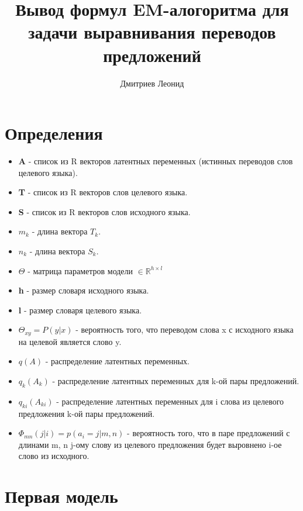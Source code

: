 \documentclass[10pt]{article}
\author{Дмитриев Леонид}
\title{Вывод формул EM-алогоритма для задачи выравнивания переводов предложений}
\begin{document}
	{
		\LARGE
		\maketitle
	}

    { \large \tableofcontents}
    
    \clearpage


   \section*{Определения}
   
   \begin{itemize}  
       \item \textbf{A} - список из R векторов латентных переменных (истинных переводов слов целевого языка).  
       \item \textbf{T} - список из R векторов слов целевого языка.  
       \item \textbf{S} - список из R векторов слов исходного языка.  
       \item $m_k$ - длина вектора $T_k$.  
       \item $n_k$ - длина вектора $S_k$.  
       \item $\Theta$ - матрица параметров модели $\in \mathbb{R}^{h \times l}$  
       \item \textbf{h} - размер словаря исходного языка.  
       \item \textbf{l} - размер словаря целевого языка.  
       \item $\Theta_{xy} = P(y|x)$ - вероятность того, что переводом слова x с исходного языка на целевой является слово y.  
       \item $q(A)$ - распределение латентных переменных.  
       \item $q_k(A_k)$ - распределение латентных переменных для k-ой пары предложений.  
       \item $q_{ki}(A_{ki})$ - распределение латентных переменных для i слова из целевого предложения k-ой пары предложений.  
       \item $\Phi_{mn} (j | i) = p(a_i = j | m, n)$ - вероятность того, что в паре предложений с длинами m, n j-ому слову из целевого предложения будет выровнено i-ое слово из исходного.
    \end{itemize} 
	
	
	\section*{Первая модель}
	
\end{document}
